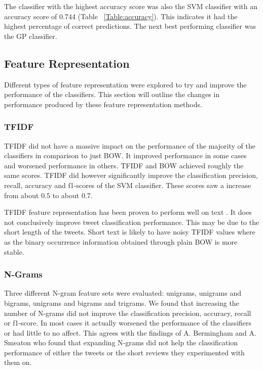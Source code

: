 The classifier with the highest accuracy score was also the SVM classifier with an accuracy score of 0.744 (Table ~\ref{Table:accuracy}). This indicates it had the highest percentage of correct predictions. The next best performing classifier was the GP classifier.

\subsection*{Feature Representation}

Different types of feature representation were explored to try and improve the performance of the classifiers. This section will outline the changes in performance produced by these feature representation methods. 

\subsubsection*{TFIDF}
TFIDF did not have a massive impact on the performance of the majority of the classifiers in comparison to just BOW. It improved performance in some cases and worsened performance in others. TFIDF and BOW achieved roughly the same scores. TFIDF did however significantly improve the classification precision, recall, accuracy and f1-scores of the SVM classifier. These scores saw a increase from about 0.5 to about 0.7.

TFIDF feature representation has been proven to perform  well on text \cite{}. It does not conclusively improve tweet classification performance. This may be due to the short length of the tweets. Short text is likely to have noisy TFIDF values where as the binary occurrence information obtained through plain BOW is more stable.

\subsubsection*{N-Grams}
Three different N-gram feature sets were evaluated: unigrams, unigrams and bigrams, unigrams and bigrams and trigrams. We found that increasing the number of N-grams did not improve the classification precision, accuracy, recall or f1-score. In most cases it actually worsened the performance of the classifiers or had little to no affect. This agrees with the findings of A. Bermingham and A. Smeaton \cite{Berm2010} who found that expanding N-grams did not help the classification performance of either the tweets or the short reviews they experimented with them on. 

